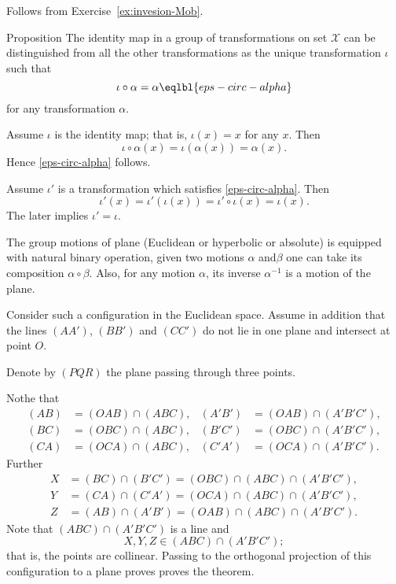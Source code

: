 Follows from
Exercise~\ref{ex:invesion-Mob}.













\begin{thm}{Proposition}
The identity map in a group of transformations on set $\mathcal X$ can be distinguished
from all the other transformations as the unique transformation $\iota$ such that
\[\iota\circ\alpha=\alpha
\eqlbl{eps-circ-alpha}\] 
for any transformation $\alpha$.
\end{thm}

Assume $\iota$ is the identity map;
that is, $\iota(x)=x$ for any  $x$.
Then 
\[\iota\circ\alpha(x)=\iota(\alpha(x))=\alpha(x).\]
Hence \ref{eps-circ-alpha} follows.

Assume $\iota'$ is a transformation which satisfies \ref{eps-circ-alpha}.
Then 
\[\iota'(x)=\iota'(\iota(x))=\iota'\circ\iota(x)=\iota(x).\]
The later implies $\iota'=\iota$.
\qeds














The group motions of plane (Euclidean or hyperbolic or absolute) is equipped with natural binary operation, given two motions $\alpha$ and$\beta$ one can take its composition $\alpha\circ\beta$.
Also, for any motion $\alpha$,
its inverse $\alpha^{-1}$ is a motion of the plane.












Consider such a configuration in the Euclidean space.
Assume in addition that the lines $(AA')$, $(BB')$ and $(CC')$ do not lie in one plane and intersect at point $O$.

Denote by $(PQR)$ the plane passing through three points.

Nothe that
\begin{align*}
(AB)&= (OAB)\cap (ABC),&
(A'B')&= (OAB)\cap (A'B'C'),\\
(BC)&= (OBC)\cap (ABC),&
(B'C')&= (OBC)\cap (A'B'C'),\\
(CA)&= (OCA)\cap (ABC),&
(C'A')&= (OCA)\cap (A'B'C').
\end{align*}
Further
\begin{align*}
X&=(BC)\cap(B'C')=(OBC)\cap (ABC)\cap (A'B'C'),\\
Y&=(CA)\cap(C'A')=(OCA)\cap (ABC)\cap (A'B'C'),\\
Z&=(AB)\cap(A'B')=(OAB)\cap (ABC)\cap (A'B'C').
\end{align*}
Note that $(ABC)\cap (A'B'C')$ is a line and
\[X,Y,Z\in (ABC)\cap (A'B'C');\]
that is, the points are collinear. 
Passing  to the orthogonal projection of this configuration to a plane proves proves the theorem.

